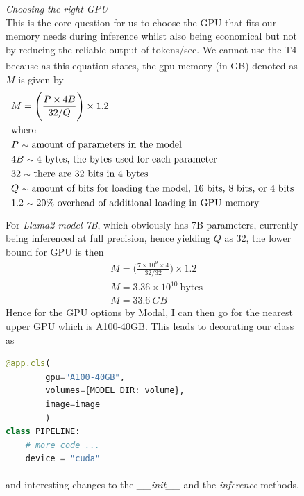 \documentclass[12pt]{article}
\newcommand{\customtext}[3]{%
    \vspace{#2} %
    \fontsize{13}{8}\textcolor{#1}{\textit{#3}}%
}
\newcommand{\sidecite}[1]{\textsuperscript{\textcolor{blue}{\textbf{\scriptsize#1}}}}
\newcommand{\maincitecount}{\sidecite{\stepcounter{maincite}\themaincite}}
\begin{document}
\begin{figure}[!htb]
    \begin{minipage}[t]{0.65\textwidth}
    \raggedright
    \customtext{xtitle}{0em}{Choosing the right GPU}\\
This is the core question for us to choose the GPU that fits our memory needs during inference whilst also 
being economical but not by reducing the reliable output of tokens/sec. We cannot use the T4 because as this 
equation states{\maincitecount}, the gpu memory (in GB) denoted as $M$ is given by 
\begin{align*}
    & M = \Bigg(\frac{P\times4B}{32/Q}\Bigg)\times1.2\\
    & \text{where}\\
    & P\ \text{\footnotesize $\sim$}\ \text{amount of parameters in the model}\\
    & 4B\ \text{\footnotesize $\sim$}\ \text{4 bytes, the bytes used for each parameter}\\
    & 32\ \text{\footnotesize $\sim$}\ \text{there are 32 bits in 4 bytes}\\
    & Q\ \text{\footnotesize $\sim$}\ \text{amount of bits for loading the model, 16 bits, 8 bits, or 4 bits}\\
    & 1.2\ \text{\footnotesize $\sim$}\ \text{20\% overhead of additional loading in GPU memory}
\end{align*}
For {\it Llama2 model 7B}, which obviously has 7B{\maincitecount} parameters, currently being inferenced at full precision, 
hence yielding $Q$ as 32, the lower bound for GPU is then 
\begin{align*}
    &M=\Bigg(\frac{7\times10^9\times4}{32/32}\Bigg)\times1.2\\
    &M = 3.36\times10^{10}\ \text{bytes}\\
    &M = 33.6\ GB
\end{align*}
Hence for the GPU options by Modal, I can then go for the nearest upper GPU which is A100-40GB. This leads to 
decorating our class as 
\begin{lstlisting}[language=python,style=python,basicstyle=\ttfamily\footnotesize]
@app.cls(
        gpu="A100-40GB", 
        volumes={MODEL_DIR: volume}, 
        image=image
        )
class PIPELINE:
    # more code ...
    device = "cuda"
\end{lstlisting}
and interesting changes to the {\it \footnotesize \_\_init\_\_} and the {\it \footnotesize inference} 
methods{\maincitecount}.
\end{minipage}%
\hspace{25pt}

\end{figure}
\end{document}
